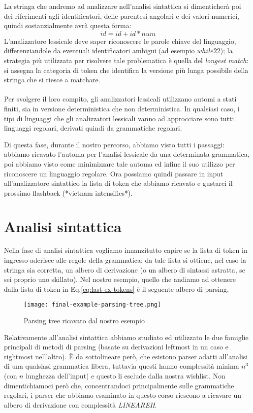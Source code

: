 \documentclass[class=book, crop=false, oneside, 12pt]{standalone}
\begin{document}
La stringa che andremo ad analizzare nell'analisi sintattica si dimenticherà poi dei riferimenti agli identificatori, delle parentesi angolari e dei valori numerici, quindi sostanzialmente avrà questa forma:
\begin{equation}
    id = id + id * num
\end{equation}
L'analizzatore lessicale deve saper riconoscere le parole chiave del linguaggio, differenziandole da eventuali identificatori ambigui (ad esempio \(while22\)); la strategia più utilizzata per risolvere tale problematica è quella del \emph{longest match}: si assegna la categoria di token che identifica la versione più lunga possibile della stringa che si riesce a matchare.
\\\\
Per svolgere il loro compito, gli analizzatori lessicali utilizzano automi a stati finiti, sia in versione deterministica che non deterministica.
In qualsiasi caso, i tipi di linguaggi che gli analizzatori lessicali vanno ad approcciare sono tutti linguaggi regolari, derivati quindi da grammatiche regolari.

Di questa fase, durante il nostro percorso, abbiamo visto tutti i passaggi: abbiamo ricavato l'automa per l'analisi lessicale da una determinata grammatica, poi abbiamo visto come minimizzare tale automa ed infine il suo utilizzo per riconoscere un linguaggio regolare.
Ora possiamo quindi passare in input all'analizzatore sintattico la lista di token che abbiamo ricavato e gustarci il prossimo flashback (*vietnam intensifies*). 

\section{Analisi sintattica}
Nella fase di analisi sintattica vogliamo innanzitutto capire se la lista di token in ingresso aderisce alle regole della grammatica; da tale lista si ottiene, nel caso la stringa sia corretta, un albero di derivazione (o un albero di sintassi astratta, se sei proprio uno skillato).
Nel nostro esempio, quello che andiamo ad ottenere dalla lista di token in Eq.\ref{eq:last-ex-tokens} è il seguente albero di parsing.
\begin{figure}[H]
    \centering
    \texttt{[image: final-example-parsing-tree.png]}
    \caption{Parsing tree ricavato dal nostro esempio}
    \label{fig:last-ex-parse-tree}
\end{figure}
Relativamente all'analisi sintattica abbiamo studiato ed utilizzato le due famiglie principali di metodi di parsing (basate su derivazioni leftmost in un caso e rightmost nell'altro). 
È da sottolineare però, che esistono parser adatti all'analisi di una qualsiasi grammatica libera, tuttavia questi hanno complessità minima \(n^3\) (con \(n\) lunghezza dell'input) e questo li esclude dalla nostra wishlist.
Non dimentichiamoci però che, concentrandoci principalmente sulle grammatiche regolari, i parser che abbiamo esaminato in questo corso riescono a ricavare un albero di derivazione con complessità \emph{LINEAREH}.
\end{document}
